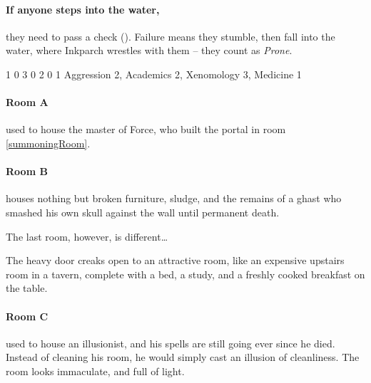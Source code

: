 \paragraph{If anyone steps into the water,}
they need to pass a  check (\tn[10]).
Failure means they stumble, then fall into the water, where Inkparch wrestles with them -- they count as \textit{Prone}.%

\setcounter{wounds}{4}

  {1}%
  {0}%
  {{3}%
  {0}%
  {2}}%
  {0}%
  {1}%
  {
    Aggression 2, Academics 2, Xenomology 3, Medicine 1
  }%
  {\longsword}%
  {
    \addtocounter{xpbonus}{3}
    \setcounter{Brawl}{2}
    \setcounter{Academics}{3}
    \setcounter{Xenomology}{2}
    \setcounter{Medicine}{1}
    \setcounter{Stealth}{1}
    \setcounter{Air}{3}
    \setcounter{Earth}{2}
    \setcounter{Fire}{2}
    \undead
  }

\showStdSpells


\showStdSpells

\paragraph{Room A} used to house the master of Force, who built the portal in room \ref{summoningRoom}.

\paragraph{Room B} houses nothing but broken furniture, sludge, and the remains of a ghast who smashed his own skull against the wall until permanent death.

The last room, however, is different\ldots

\begin{boxtext}
  The heavy door creaks open to an attractive room, like an expensive upstairs room in a tavern, complete with a bed, a study, and a freshly cooked breakfast on the table.
\end{boxtext}
\paragraph{Room C} used to house an illusionist, and his spells are still going ever since he died.
Instead of cleaning his room, he would simply cast an illusion of cleanliness.
The room looks immaculate, and full of light.

